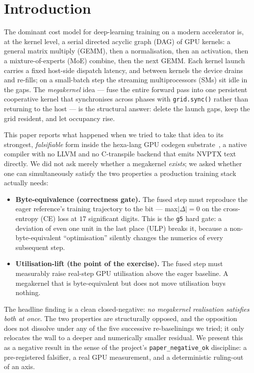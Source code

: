 \documentclass[11pt,a4paper]{article}
\begin{document}
\section{Introduction}
\label{sec:intro}

The dominant cost model for deep-learning training on a modern accelerator
is, at the kernel level, a serial directed acyclic graph (DAG) of GPU
kernels: a general matrix multiply (GEMM), then a normalisation, then an
activation, then a mixture-of-experts (MoE) combine, then the next GEMM.
Each kernel launch carries a fixed host-side dispatch latency, and between
kernels the device drains and re-fills; on a small-batch step the
streaming multiprocessors (SMs) sit idle in the gaps. The
\emph{megakernel} idea --- fuse the entire forward pass into one persistent
cooperative kernel that synchronises across phases with
\texttt{grid.sync()} rather than returning to the host --- is the
structural answer: delete the launch gaps, keep the grid resident, and let
occupancy rise.

This paper reports what happened when we tried to take that idea to its
strongest, \emph{falsifiable} form inside the hexa-lang GPU codegen
substrate~\citep{hexalang2026gpu}, a native compiler with no LLVM and no
C-transpile backend that emits NVPTX text directly. We did not ask merely
whether a megakernel \emph{exists}; we asked whether one can simultaneously
satisfy the two properties a production training stack actually needs:

\begin{itemize}\itemsep0.25em
\item \textbf{Byte-equivalence (correctness gate).} The fused step must
reproduce the eager reference's training trajectory to the bit ---
max$|\Delta|=0$ on the cross-entropy (CE) loss at $17$ significant digits.
This is the \texttt{g5} hard gate: a deviation of even one unit in the last
place (ULP) breaks it, because a non-byte-equivalent ``optimisation''
silently changes the numerics of every subsequent step.
\item \textbf{Utilisation-lift (the point of the exercise).} The fused step
must measurably raise real-step GPU utilisation above the eager baseline.
A megakernel that is byte-equivalent but does not move utilisation buys
nothing.
\end{itemize}

\noindent The headline finding is a clean closed-negative: \emph{no
megakernel realisation satisfies both at once}. The two properties are
structurally opposed, and the opposition does not dissolve under any of the
five successive re-baselinings we tried; it only relocates the wall to a
deeper and numerically smaller residual. We present this as a negative
result in the sense of the project's \texttt{paper\_negative\_ok}
discipline: a pre-registered falsifier, a real GPU measurement, and a
deterministic ruling-out of an axis.
\end{document}
